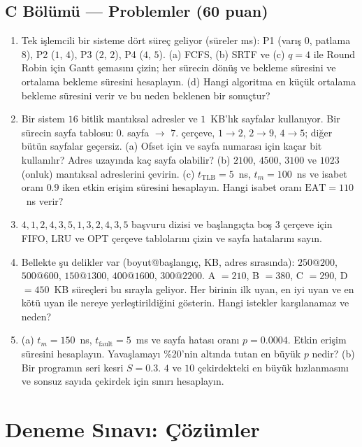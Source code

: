 \subsection*{C Bölümü --- Problemler \hfill (60 puan)}
\begin{enumerate}[leftmargin=2.0em,label=C\arabic*.,itemsep=0.6em]
  \item {} Tek işlemcili bir sisteme dört süreç geliyor (süreler ms): P1 (varış $0$, patlama $8$), P2 ($1$, $4$), P3 ($2$, $2$), P4 ($4$, $5$). (a) FCFS, (b) SRTF ve (c) $q = 4$ ile Round Robin için Gantt şemasını çizin; her sürecin dönüş ve bekleme süresini ve ortalama bekleme süresini hesaplayın. (d) Hangi algoritma en küçük ortalama bekleme süresini verir ve bu neden beklenen bir sonuçtur?
  \item {} Bir sistem $16$ bitlik mantıksal adresler ve $1$~KB'lık sayfalar kullanıyor. Bir sürecin sayfa tablosu: $0$. sayfa $\to$ $7$. çerçeve, $1 \to 2$, $2 \to 9$, $4 \to 5$; diğer bütün sayfalar geçersiz.
  (a) Ofset için ve sayfa numarası için kaçar bit kullanılır? Adres uzayında kaç sayfa olabilir?
  (b) $2100$, $4500$, $3100$ ve $1023$ (onluk) mantıksal adreslerini çevirin.
  (c) $t_{\text{TLB}} = 5$~ns, $t_m = 100$~ns ve isabet oranı $0.9$ iken etkin erişim süresini hesaplayın. Hangi isabet oranı $\text{EAT} = 110$~ns verir?
  \item {} $4, 1, 2, 4, 3, 5, 1, 3, 2, 4, 3, 5$ başvuru dizisi ve başlangıçta boş $3$ çerçeve için FIFO, LRU ve OPT çerçeve tablolarını çizin ve sayfa hatalarını sayın.
  \item {} Bellekte şu delikler var (boyut@başlangıç, KB, adres sırasında): $250@200$, $500@600$, $150@1300$, $400@1600$, $300@2200$. A $=210$, B $=380$, C $=290$, D $=450$~KB süreçleri bu sırayla geliyor. Her birinin ilk uyan, en iyi uyan ve en kötü uyan ile nereye yerleştirildiğini gösterin. Hangi istekler karşılanamaz ve neden?
  \item {} (a) $t_m = 150$~ns, $t_{\text{fault}} = 5$~ms ve sayfa hatası oranı $p = 0.0004$. Etkin erişim süresini hesaplayın. Yavaşlamayı \%20'nin altında tutan en büyük $p$ nedir?
  (b) Bir programın seri kesri $S = 0.3$. $4$ ve $10$ çekirdekteki en büyük hızlanmasını ve sonsuz sayıda çekirdek için sınırı hesaplayın.
\end{enumerate}

\newpage
\section{Deneme Sınavı: Çözümler}
\label{sec:solutions}
